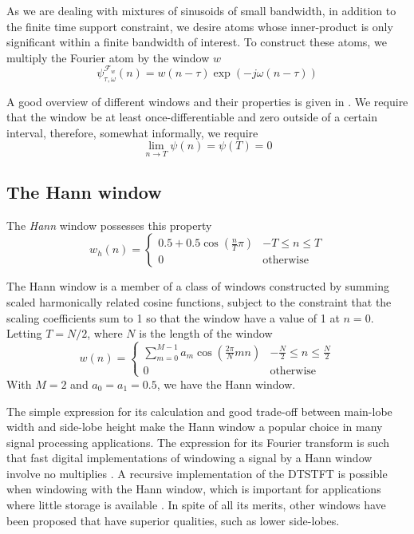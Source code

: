 As we are dealing with mixtures of sinusoids of small bandwidth, in addition to
the finite time support constraint, we desire atoms whose inner-product is only
significant within a finite bandwidth of interest. To construct these atoms, we
multiply the Fourier atom by the window $w$
\[
    \psi_{\tau,\omega}^{\mathcal{F}_{w}}(n) = w(n-\tau) \exp(-j\omega(n-\tau))
\]

A good overview of different windows and their properties is given in
\cite{harris1978use}. We require that the window be at least
once-differentiable and zero outside of a certain interval, therefore, somewhat
informally, we require
\[
    \lim_{n \rightarrow T} \psi(n) = \psi(T) = 0
\]

\subsection{The Hann window}

The \textit{Hann} window possesses this property
\[
    w_{h}(n) = \begin{cases}
        0.5 + 0.5 \cos \left( \frac{n}{T}\pi \right) & -T \leq n \leq T \\
        0 & \text{otherwise}
    \end{cases}
\]

The Hann window is a member of a class of windows constructed by summing scaled
harmonically related cosine functions, subject to the constraint that the
scaling coefficients sum to 1 so that the window have a value of 1 at $n=0$.
Letting $T=N/2$, where $N$ is the length of the window
\[
    w(n) = \begin{cases}
        \sum_{m=0}^{M-1}a_{m}\cos \left( \frac{2\pi}{N}mn \right) & -\frac{N}{2} \leq n
        \leq \frac{N}{2} \\
        0 & \text{otherwise}
    \end{cases}
\]
With $M=2$ and $a_0 = a_1 = 0.5$, we have the Hann window.

The simple expression for its calculation and good trade-off between main-lobe
width and side-lobe height make the Hann window a popular choice in many signal
processing applications. The expression for its Fourier transform is such that
fast digital implementations of windowing a signal by a Hann window involve no
multiplies \cite[p.~183]{harris1978use}. A recursive implementation of the
DTSTFT is possible when windowing with the Hann window, which is important for
applications where little storage is available \cite[p.~102]{stankovic2014time}.
In spite of all its merits, other windows have been proposed that have superior
qualities, such as lower side-lobes.

